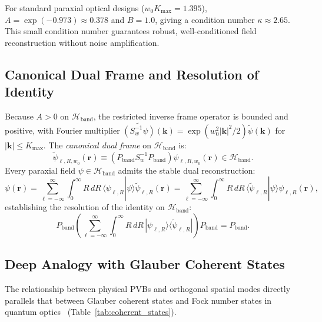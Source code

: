 \documentclass[11pt,a4paper]{article}
\begin{document}
For standard paraxial optical designs ($w_0 K_{\max} = 1.395$), $A = \exp(-0.973) \approx 0.378$ and $B = 1.0$, giving a condition number $\kappa \approx 2.65$. This small condition number guarantees robust, well-conditioned field reconstruction without noise amplification.

\subsection{Canonical Dual Frame and Resolution of Identity}

Because $A > 0$ on $\mathcal{H}_{\text{band}}$, the restricted inverse frame operator is bounded and positive, with Fourier multiplier $\widetilde{(S_w^{-1} \psi)}(\mathbf{k}) = \exp(w_0^2 |\mathbf{k}|^2 / 2) \widetilde{\psi}(\mathbf{k})$ for $|\mathbf{k}| \le K_{\max}$. The \emph{canonical dual frame} on $\mathcal{H}_{\text{band}}$ is:
\begin{equation}
\widetilde{\psi}_{\ell, R, w_0}(\mathbf{r}) \equiv (P_{\text{band}} S_w^{-1} P_{\text{band}}) \psi_{\ell, R, w_0}(\mathbf{r}) \in \mathcal{H}_{\text{band}}.
\label{eq:canonical_dual_def}
\end{equation}
Every paraxial field $\psi \in \mathcal{H}_{\text{band}}$ admits the stable dual reconstruction:
\begin{equation}
\boxed{\psi(\mathbf{r}) = \sum_{\ell=-\infty}^\infty \int_0^\infty R \, dR \, \langle \psi_{\ell, R} | \psi \rangle \widetilde{\psi}_{\ell, R}(\mathbf{r}) = \sum_{\ell=-\infty}^\infty \int_0^\infty R \, dR \, \langle \widetilde{\psi}_{\ell, R} | \psi \rangle \psi_{\ell, R}(\mathbf{r}),}
\label{eq:dual_expansion}
\end{equation}
establishing the resolution of the identity on $\mathcal{H}_{\text{band}}$:
\begin{equation}
P_{\text{band}} \left( \sum_{\ell=-\infty}^\infty \int_0^\infty R \, dR \, |\psi_{\ell, R}\rangle \langle \widetilde{\psi}_{\ell, R}| \right) P_{\text{band}} = P_{\text{band}}.
\label{eq:resolution_identity}
\end{equation}

\subsection{Deep Analogy with Glauber Coherent States}

The relationship between physical PVBs and orthogonal spatial modes directly parallels that between Glauber coherent states and Fock number states in quantum optics~\cite{Klauder1985,Perelomov1986} (Table~\ref{tab:coherent_states}).
\end{document}

